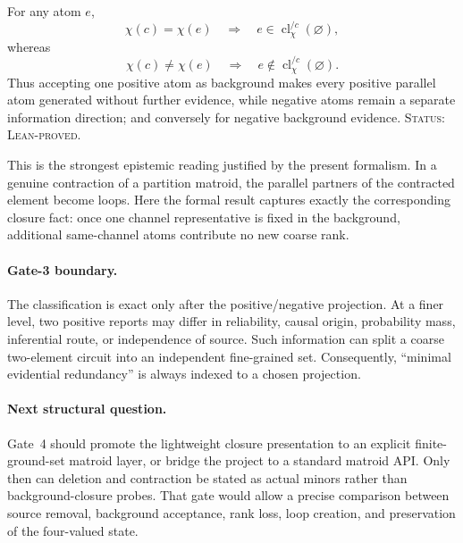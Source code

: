 \begin{proposition}
For any atom \(e\),
\[
  \chi(c)=\chi(e)
  \quad\Longrightarrow\quad
  e\in\operatorname{cl}_{\chi}^{/c}(\varnothing),
\]
whereas
\[
  \chi(c)\neq\chi(e)
  \quad\Longrightarrow\quad
  e\notin\operatorname{cl}_{\chi}^{/c}(\varnothing).
\]
Thus accepting one positive atom as background makes every positive parallel
atom generated without further evidence, while negative atoms remain a separate
information direction; and conversely for negative background evidence.
\textup{\textsc{Status: Lean-proved.}}
\end{proposition}

This is the strongest epistemic reading justified by the present formalism. In
a genuine contraction of a partition matroid, the parallel partners of the
contracted element become loops. Here the formal result captures exactly the
corresponding closure fact: once one channel representative is fixed in the
background, additional same-channel atoms contribute no new coarse rank.

\paragraph{Gate-3 boundary.}
The classification is exact only after the positive/negative projection. At a
finer level, two positive reports may differ in reliability, causal origin,
probability mass, inferential route, or independence of source. Such information
can split a coarse two-element circuit into an independent fine-grained set.
Consequently, ``minimal evidential redundancy'' is always indexed to a chosen
projection.

\paragraph{Next structural question.}
Gate~4 should promote the lightweight closure presentation to an explicit
finite-ground-set matroid layer, or bridge the project to a standard matroid API.
Only then can deletion and contraction be stated as actual minors rather than
background-closure probes. That gate would allow a precise comparison between
source removal, background acceptance, rank loss, loop creation, and preservation
of the four-valued state.
